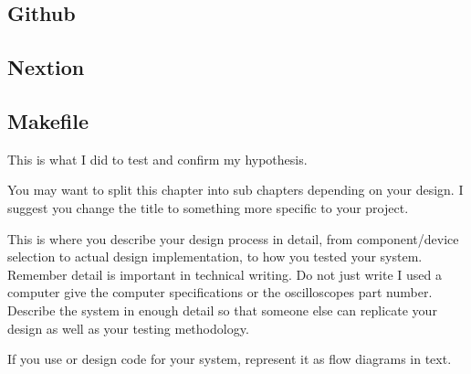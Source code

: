 \subsection{Github}
\subsection{Nextion}
\subsection{Makefile}

This is what I did to test and confirm my hypothesis.


You may want to split this chapter into sub chapters depending on your design. I suggest you change
the title to something more specific to your project.

This is where you describe your design process in detail, from component/device selection to actual
design implementation, to how you tested your system. Remember detail is important in technical
writing. Do not just write I used a computer give the computer specifications or the oscilloscopes part
number. Describe the system in enough detail so that someone else can replicate your design as well
as your testing methodology.

If you use or design code for your system, represent it as flow diagrams in text.
